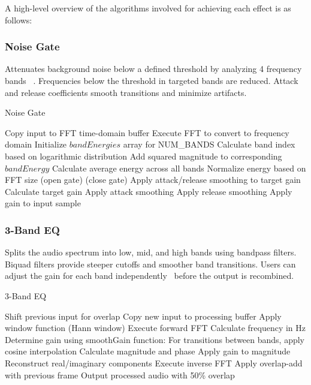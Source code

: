 \documentclass[conference]{IEEEtran}
\begin{document}
A high-level overview of the algorithms involved for achieving each effect is as follows:

\subsubsection{Noise Gate}
Attenuates background noise below a defined threshold by analyzing 4 frequency bands ~\cite{sang2009}. Frequencies below the threshold in targeted bands are reduced. Attack and release coefficients smooth transitions and minimize artifacts.

\begin{algorithm}
\caption{Noise Gate}
\begin{algorithmic}[1]
\State Copy input to FFT time-domain buffer
\State Execute FFT to convert to frequency domain
\State Initialize $bandEnergies$ array for NUM\_BANDS
    \State Calculate band index based on logarithmic distribution
    \State Add squared magnitude to corresponding $bandEnergy$
\EndFor
\State Calculate average energy across all bands
\State Normalize energy based on FFT size
    \State {} (open gate)
\Else
    \State {} (close gate)
\EndIf
\State Apply attack/release smoothing to target gain
\EndProcedure
{}
\State Calculate target gain
        \State Apply attack smoothing
    \Else
        \State Apply release smoothing
    \EndIf
    \State Apply gain to input sample
\EndFor
\EndProcedure
\end{algorithmic}
\end{algorithm}

\subsubsection{3-Band EQ}
Splits the audio spectrum into low, mid, and high bands using bandpass filters. Biquad filters provide steeper cutoffs and smoother band transitions. Users can adjust the gain for each band independently~\cite{valimaki2016} before the output is recombined.

\begin{algorithm}
\caption{3-Band EQ}
\begin{algorithmic}[1]
\State Shift previous input for overlap
\State Copy new input to processing buffer
\State Apply window function (Hann window)
\State Execute forward FFT
    \State Calculate frequency in Hz
    \State Determine gain using smoothGain function:
    \State \hspace{\algorithmicindent} For transitions between bands, apply cosine interpolation
    \State Calculate magnitude and phase
    \State Apply gain to magnitude
    \State Reconstruct real/imaginary components
\EndFor
\State Execute inverse FFT
\State Apply overlap-add with previous frame
\State Output processed audio with 50\% overlap
\EndProcedure
\end{algorithmic}
\end{algorithm}
\end{document}
